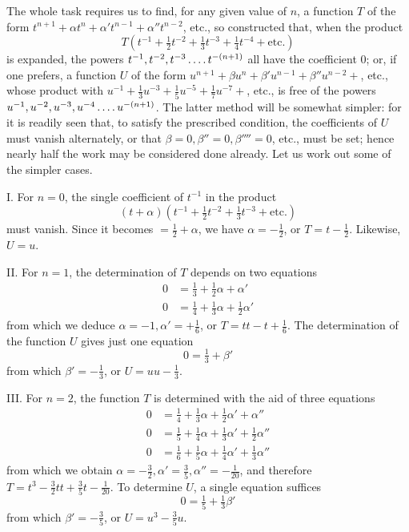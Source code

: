 The whole task requires us to find, for any given value of $n$, a function $T$ of the form $t^{n+1}+\alpha t^n+\alpha't^{n-1}+\alpha''t^{n-2}$, etc., so constructed that, when the product
\[
T(t^{-1}+\tfrac12t^{-2}+\tfrac13t^{-3}+\tfrac14t^{-4}+\text{etc.})
\]
is expanded, the powers $t^{-1},t^{-2},t^{-3}\mathinner{.\,.\,.\,.}t^{-(n+1)}$ all have the coefficient $0$; or, if one prefers, a function $U$ of the form $u^{n+1}+\beta u^n+\beta'u^{n-1}+\beta''u^{n-2}+$, etc., whose product with $u^{-1}+\frac13u^{-3}+\frac15u^{-5}+\frac17u^{-7}+$, etc., is free of the powers %
$u^{-1},u^{-2},u^{-3},u^{-4}\mathinner{.\,.\,.\,.}u^{-(n+1)}$. The latter method will be somewhat simpler: for it is readily seen that, to satisfy the prescribed condition, the coefficients of $U$ must vanish alternately, or that $\beta=0,\beta''=0,\beta''''=0$, etc., must be set; hence nearly half the work may be considered done already. Let us work out some of the simpler cases.

I. For $n=0$, the single coefficient of $t^{-1}$ in the product
\[
(t+\alpha)(t^{-1}+\tfrac12t^{-2}+\tfrac13t^{-3}+\text{etc.})
\]
must vanish. Since it becomes $=\frac12+\alpha$, we have $\alpha=-\frac12$, or $T=t-\frac12$. Likewise, $U=u$.

II. For $n=1$, the determination of $T$ depends on two equations
\[
\begin{aligned}
0&=\tfrac13+\tfrac12\alpha+\alpha'\\
0&=\tfrac14+\tfrac13\alpha+\tfrac12\alpha'
\end{aligned}
\]
from which we deduce $\alpha=-1,\alpha'=+\frac16$, or $T=tt-t+\frac16$. The determination of the function $U$ gives just one equation
\[
0=\tfrac13+\beta'
\]
from which $\beta'=-\frac13$, or $U=uu-\frac13$.

III. For $n=2$, the function $T$ is determined with the aid of three equations
\[
\begin{aligned}
0&=\tfrac14+\tfrac13\alpha+\tfrac12\alpha'+\alpha''\\
0&=\tfrac15+\tfrac14\alpha+\tfrac13\alpha'+\tfrac12\alpha''\\
0&=\tfrac16+\tfrac15\alpha+\tfrac14\alpha'+\tfrac13\alpha''
\end{aligned}
\]
from which we obtain $\alpha=-\frac32,\alpha'=\frac35,\alpha''=-\frac1{20}$, and therefore $T=t^3-\frac32tt+\frac35t-\frac1{20}$. To determine $U$, a single equation suffices
\[
0=\tfrac15+\tfrac13\beta'
\]
from which $\beta'=-\frac35$, or $U=u^3-\frac35u$.

